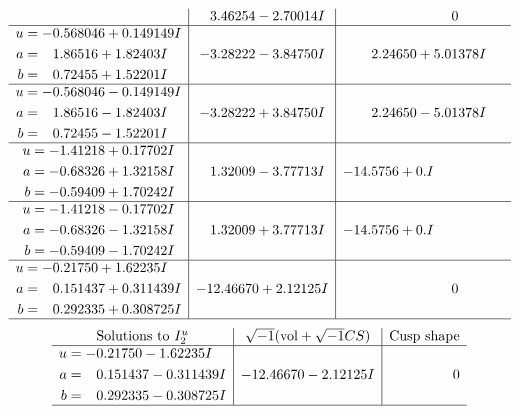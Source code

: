 \documentclass[1p]{elsarticle_modified}
\theoremstyle{definition}
\newcommand{\I}{\sqrt{-1}}
\begin{document}
$$\begin{array}{c|c|c}
 & \phantom{-}3.46254 - 2.70014 I & \phantom{-0.000000 } 0 \\ \hline\begin{aligned}
u &= -0.568046 + 0.149149 I \\
a &= \phantom{-}1.86516 + 1.82403 I \\
b &= \phantom{-}0.72455 + 1.52201 I\end{aligned}
 & -3.28222 - 3.84750 I & \phantom{-}2.24650 + 5.01378 I \\ \hline\begin{aligned}
u &= -0.568046 - 0.149149 I \\
a &= \phantom{-}1.86516 - 1.82403 I \\
b &= \phantom{-}0.72455 - 1.52201 I\end{aligned}
 & -3.28222 + 3.84750 I & \phantom{-}2.24650 - 5.01378 I \\ \hline\begin{aligned}
u &= -1.41218 + 0.17702 I \\
a &= -0.68326 + 1.32158 I \\
b &= -0.59409 + 1.70242 I\end{aligned}
 & \phantom{-}1.32009 - 3.77713 I & -14.5756 + 0. I\phantom{ +0.000000I} \\ \hline\begin{aligned}
u &= -1.41218 - 0.17702 I \\
a &= -0.68326 - 1.32158 I \\
b &= -0.59409 - 1.70242 I\end{aligned}
 & \phantom{-}1.32009 + 3.77713 I & -14.5756 + 0. I\phantom{ +0.000000I} \\ \hline\begin{aligned}
u &= -0.21750 + 1.62235 I \\
a &= \phantom{-}0.151437 + 0.311439 I \\
b &= \phantom{-}0.292335 + 0.308725 I\end{aligned}
 & -12.46670 + 2.12125 I & \phantom{-0.000000 } 0\\
 \hline 
 \end{array}$$\newpage$$\begin{array}{c|c|c}  
\text{Solutions to }I^u_{2}& \I (\text{vol} + \sqrt{-1}CS) & \text{Cusp shape}\\
 \hline 
\begin{aligned}
u &= -0.21750 - 1.62235 I \\
a &= \phantom{-}0.151437 - 0.311439 I \\
b &= \phantom{-}0.292335 - 0.308725 I\end{aligned}
 & -12.46670 - 2.12125 I & \phantom{-0.000000 } 0\\
 \hline 
 \end{array}$$\newpage
\end{document}
